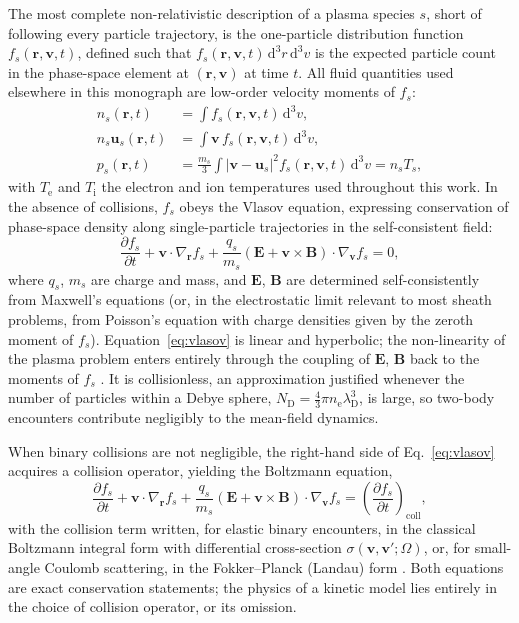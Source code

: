 The most complete non-relativistic description of a plasma species $s$, short of following every particle trajectory, is the one-particle distribution function $f_{s}(\mathbf{r},\mathbf{v},t)$, defined such that $f_{s}(\mathbf{r},\mathbf{v},t)\,\mathrm{d}^{3}r\,\mathrm{d}^{3}v$ is the expected particle count in the phase-space element at $(\mathbf{r},\mathbf{v})$ at time $t$. All fluid quantities used elsewhere in this monograph are low-order velocity moments of $f_{s}$:
\begin{align}
n_{s}(\mathbf{r},t) &= \int f_{s}(\mathbf{r},\mathbf{v},t)\,\mathrm{d}^{3}v, \\
n_{s}\mathbf{u}_{s}(\mathbf{r},t) &= \int \mathbf{v}\, f_{s}(\mathbf{r},\mathbf{v},t)\,\mathrm{d}^{3}v, \\
p_{s}(\mathbf{r},t) &= \frac{m_{s}}{3}\int |\mathbf{v}-\mathbf{u}_{s}|^{2} f_{s}(\mathbf{r},\mathbf{v},t)\,\mathrm{d}^{3}v = n_{s} T_{s},
\end{align}
with $T_{\mathrm{e}}$ and $T_{\mathrm{i}}$ the electron and ion temperatures used throughout this work. In the absence of collisions, $f_s$ obeys the Vlasov equation, expressing conservation of phase-space density along single-particle trajectories in the self-consistent field:
\begin{equation}
\frac{\partial f_{s}}{\partial t} + \mathbf{v}\cdot\nabla_{\mathbf{r}} f_{s} + \frac{q_{s}}{m_{s}}\left(\mathbf{E} + \mathbf{v}\times\mathbf{B}\right)\cdot\nabla_{\mathbf{v}} f_{s} = 0,
\label{eq:vlasov}
\end{equation}
where $q_{s}$, $m_{s}$ are charge and mass, and $\mathbf{E}$, $\mathbf{B}$ are determined self-consistently from Maxwell's equations (or, in the electrostatic limit relevant to most sheath problems, from Poisson's equation with charge densities given by the zeroth moment of $f_{s}$). Equation~\eqref{eq:vlasov} is linear and hyperbolic; the non-linearity of the plasma problem enters entirely through the coupling of $\mathbf{E}$, $\mathbf{B}$ back to the moments of $f_{s}$ \cite{ref0670}. It is collisionless, an approximation justified whenever the number of particles within a Debye sphere, $N_{\mathrm{D}} = \tfrac{4}{3}\pi n_{\mathrm{e}} \lambda_{\mathrm{D}}^{3}$, is large, so two-body encounters contribute negligibly to the mean-field dynamics.

When binary collisions are not negligible, the right-hand side of Eq.~\eqref{eq:vlasov} acquires a collision operator, yielding the Boltzmann equation,
\begin{equation}
\frac{\partial f_{s}}{\partial t} + \mathbf{v}\cdot\nabla_{\mathbf{r}} f_{s} + \frac{q_{s}}{m_{s}}\left(\mathbf{E} + \mathbf{v}\times\mathbf{B}\right)\cdot\nabla_{\mathbf{v}} f_{s} = \left(\frac{\partial f_{s}}{\partial t}\right)_{\!\mathrm{coll}},
\label{ch13-eq:boltzmann}
\end{equation}
with the collision term written, for elastic binary encounters, in the classical Boltzmann integral form with differential cross-section $\sigma(\mathbf{v},\mathbf{v}';\Omega)$, or, for small-angle Coulomb scattering, in the Fokker--Planck (Landau) form \cite{ref0670}. Both equations are exact conservation statements; the physics of a kinetic model lies entirely in the choice of collision operator, or its omission.

